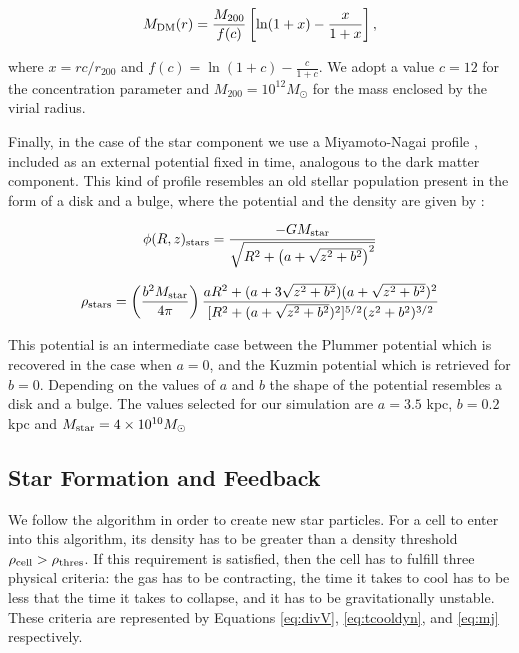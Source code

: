 \documentclass[twocolumn]{aastex}
\newcommand{\msun}{M_\odot}
\newcommand{\mdm}{M_{\rm DM}}
\newcommand{\moo}{M_{200}}
\newcommand{\roo}{r_{200}}
\begin{document}
	\begin{equation}
	\mdm (r)=\frac{\moo}{f(c)}\left[ \ln(1+x) - \frac{x}{1+x} \right],
	\label{NFWmassprofile}
	\end{equation}

\noindent where $x=rc/\roo$ and $f(c)=\ln(1+c)-\frac{c}{1+c}$. We adopt a value $c=12$ for the concentration parameter and $\moo=10^{12} \msun$ for the mass enclosed by the virial radius.

Finally, in the case of the star component we use a Miyamoto-Nagai profile \citep{Miyamoto_Nagai_75}, included as an external potential fixed in time, analogous to the dark matter component. This kind of profile resembles an old stellar population present in the form of a disk and a bulge, where the potential and the density are given by \citet{Miyamoto_Nagai_75, Binney_Tremaine_08}:

	\begin{equation}
	\phi(R,z)_{\rm stars} = \frac{-GM_{\rm star}}{\sqrt{R^2+\left( a+\sqrt{z^2+b^2} \right)^2}}
	\label{eq:MNpotential}
	\end{equation}

	\begin{equation}
	\rho_{\rm stars}=\left( \frac{b^2M_{\rm star}}{4\pi} \right) \frac{aR^2+(a+3\sqrt{z^2+b^2})(a+\sqrt{z^2+b^2})^2}{[R^2+(a+\sqrt{z^2+b^2})^2]^{5/2}(z^2+b^2)^{3/2}}
	\label{eq:MNdensity}
	\end{equation}

This potential is an intermediate case between the Plummer potential \citep{Plummer_11} which is recovered in the case when $a=0$, and the Kuzmin potential \citep{Kuzmin_56, Toomre_63} which is retrieved for $b=0$. Depending on the values of $a$ and $b$ the shape of the potential resembles a disk and a bulge. The values selected for our simulation are $a=3.5$ kpc, $b=0.2$ kpc and $M_{\rm star}=4\times10^{10} \msun$

\subsection{Star Formation and Feedback}
\label{subsec:SFandFeedback}

We follow the \citet{Cen_Ostriker_92} algorithm in order to create new star particles. For a cell to enter into this algorithm, its density has to be greater than a density threshold  $\rho_{\rm cell} > \rho_{\rm thres}$. If this requirement is satisfied, then the cell has to fulfill three physical criteria: the gas has to be contracting, the time it takes to cool has to be less that the time it takes to collapse, and it has to be gravitationally unstable. These criteria are represented by Equations \ref{eq:divV}, \ref{eq:tcooldyn}, and \ref{eq:mj} respectively.
\end{document}
